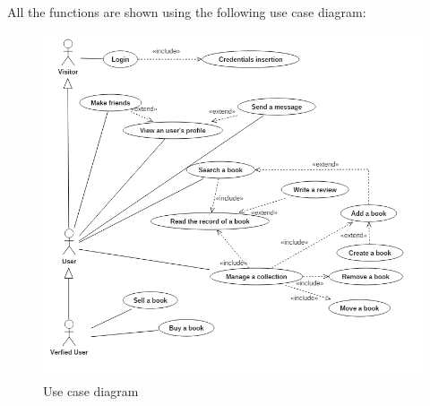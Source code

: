 All the functions are shown using the following use case diagram:
\begin{figure}[!ht]
    \centering
	\includegraphics[scale=0.55]{images/use-case-diagram.png}
	\caption{Use case diagram}
	\label{fig:usecasediagram}
\end{figure}

